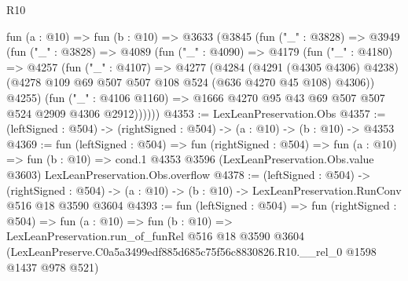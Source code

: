 \begin{lexlean}{R10}
\begin{coremodule}
  fun (a : @10) =>
  fun (b : @10) =>
  @3633
    (@3845
      (fun ("_" : @3828) =>
      @3949
        (fun ("_" : @3828) =>
        @4089
          (fun ("_" : @4090) =>
          @4179
            (fun ("_" : @4180) =>
            @4257
              (fun ("_" : @4107) =>
              @4277
                (@4284
                  (@4291 (@4305 @4306) @4238)
                  (@4278 @109 @69 @507 @507 @108 @524 (@636 @4270 @45 @108) @4306))
                @4255)
              (fun ("_" : @4106 @1160) =>
              @1666 @4270 @95 @43 @69 @507 @507 @524 @2909 @4306 @2912))))))
@4353 := LexLeanPreservation.Obs
@4357 := (leftSigned : @504) -> (rightSigned : @504) -> (a : @10) -> (b : @10) -> @4353
@4369 := fun (leftSigned : @504) =>
  fun (rightSigned : @504) =>
  fun (a : @10) =>
  fun (b : @10) =>
  cond.{1} @4353 @3596 (LexLeanPreservation.Obs.value @3603) LexLeanPreservation.Obs.overflow
@4378 := (leftSigned : @504) ->
  (rightSigned : @504) -> (a : @10) -> (b : @10) -> LexLeanPreservation.RunConv @516 @18 @3590 @3604
@4393 := fun (leftSigned : @504) =>
  fun (rightSigned : @504) =>
  fun (a : @10) =>
  fun (b : @10) =>
  LexLeanPreservation.run_of_funRel
    @516
    @18
    @3590
    @3604
    (LexLeanPreserve.C0a5a3499edf885d685c75f56c8830826.R10.__rel_0 @1598 @1437 @978 @521)
\end{coremodule}
\end{lexlean}
